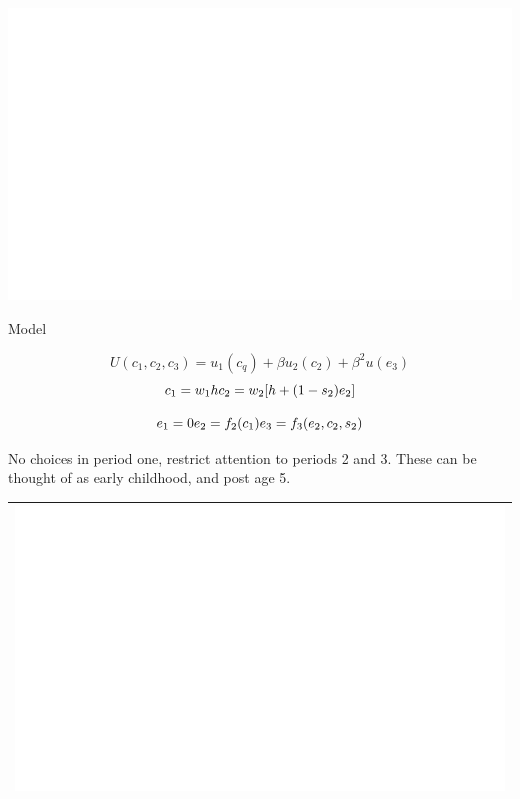 \documentclass[ignorenonframetext,]{beamer}
\begin{document}
\begin{frame}{\includegraphics{shah2017_files/figure-beamer/authors model-1.pdf}}

\begin{block}{Model}

\[ U(c_1,c_2,c_3) = u_1(c_q)+ \beta u_2(c_2) + \beta^2 u(e_3) \]
\[ c_1=w_1 h \\
 c_2 = w_2[h+ (1-s_2)e_2]\]

\[ e_1 = 0 \\
e_2 = f_2(c_1) \\
e_3 = f_3(e_2,c_2,s_2)
\]

No choices in period one, restrict attention to periods 2 and 3. These
can be thought of as early childhood, and post age 5.

\begin{longtable}[]{@{}l@{}}
\toprule
\begin{minipage}[t]{0.05\columnwidth}\raggedright\strut
\includegraphics{shah2017_files/figure-beamer/reality-1.pdf}\strut
\end{minipage}\tabularnewline
\bottomrule
\end{longtable}


\end{block}
\end{frame}
\end{document}
